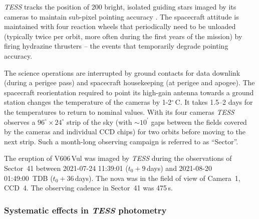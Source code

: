 \documentclass[twocolumn]{aastex631}
\newcommand{\nova}{V606\,Vul}
\begin{document}
{\em TESS} tracks the position of 200 bright, isolated guiding stars imaged by its cameras 
to maintain sub-pixel pointing accuracy \citep{tess_finepointing}.
The spacecraft attitude is maintained with four reaction wheels that
periodically need to be unloaded (typically twice per orbit, more often
during the first years of the mission) 
by firing hydrazine thrusters -- the events that temporarily degrade pointing accuracy.

The science operations are interrupted by ground contacts for data 
downlink (during a perigee pass) and spacecraft housekeeping (at perigee and apogee).
The spacecraft reorientation required to point its high-gain antenna towards
a ground station changes the temperature of the cameras by 1-2$^\circ$\,C.
It takes 1.5--2 days for the temperatures to return to nominal values.
%
With its four cameras {\em TESS} observes a $96^\circ \times 24^\circ$ strip of the sky 
(with $\sim10^\prime$ gaps between the fields covered by the cameras
and individual CCD chips) for two orbits before moving to the next strip. 
Such a month-long observing campaign is referred to as ``Sector''.

The eruption of \nova{} was imaged by {\em TESS} during the observations of
Sector~41 between 2021-07-24 11:39:01 ($t_0 + 9$\,days) 
and 2021-08-20 01:49:00~TDB ($t_0 + 36$\,days). 
The nova was in the field of view of Camera~1, CCD~4.
The observing cadence in Sector~41 was 475\,s.

\subsubsection{Systematic effects in {\em TESS} photometry}
\label{sec:tesssystematics}
\end{document}
